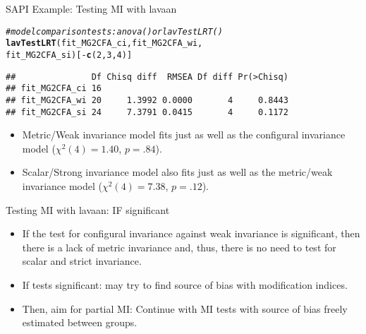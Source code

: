 \documentclass[10pt]{beamer}\usepackage[]{graphicx}\usepackage[]{xcolor}
\makeatletter
\newcommand{\hlnum}[1]{\textcolor[rgb]{0.686,0.059,0.569}{#1}}%
\newcommand{\hlcom}[1]{\textcolor[rgb]{0.678,0.584,0.686}{\textit{#1}}}%
\newcommand{\hlopt}[1]{\textcolor[rgb]{0,0,0}{#1}}%
\newcommand{\hldef}[1]{\textcolor[rgb]{0.345,0.345,0.345}{#1}}%
\newcommand{\hlkwd}[1]{\textcolor[rgb]{0.737,0.353,0.396}{\textbf{#1}}}%
\newenvironment{kframe}{%
 \def\at@end@of@kframe{}%
 \ifinner\ifhmode%
  \def\at@end@of@kframe{\end{minipage}}%
  \begin{minipage}{\columnwidth}%
 \fi\fi%
 \def\FrameCommand##1{\hskip\@totalleftmargin \hskip-\fboxsep
 \colorbox{shadecolor}{##1}\hskip-\fboxsep
     \hskip-\linewidth \hskip-\@totalleftmargin \hskip\columnwidth}%
 \MakeFramed {\advance\hsize-\width
   \@totalleftmargin\z@ \linewidth\hsize
   \@setminipage}}%
 {\par\unskip\endMakeFramed%
 \at@end@of@kframe}
\newenvironment{knitrout}{}{} %
\makeatother
\begin{document}
\begin{frame}[fragile]{SAPI Example: Testing MI with lavaan}

\begin{knitrout}
\color{fgcolor}\begin{kframe}
\begin{alltt}
\hlcom{# model comparison tests: anova() or lavTestLRT()}
\hlkwd{lavTestLRT}\hldef{(fit_MG2CFA_ci, fit_MG2CFA_wi,}
           \hldef{fit_MG2CFA_si)[}\hlopt{-}\hlkwd{c}\hldef{(}\hlnum{2}\hldef{,}\hlnum{3}\hldef{,}\hlnum{4}\hldef{)]}
\end{alltt}
\begin{verbatim}
##               Df Chisq diff  RMSEA Df diff Pr(>Chisq)
## fit_MG2CFA_ci 16                                     
## fit_MG2CFA_wi 20     1.3992 0.0000       4     0.8443
## fit_MG2CFA_si 24     7.3791 0.0415       4     0.1172
\end{verbatim}
\end{kframe}
\end{knitrout}

\begin{itemize}
    \item Metric/Weak invariance model fits just as well as the configural invariance model ($\chi^2(4) = 1.40$, $p = .84$).
    \item Scalar/Strong invariance model also fits just as well as the metric/weak invariance model ($\chi^2(4) = 7.38$, $p = .12$).
\end{itemize}

\end{frame}
%
\begin{frame}{Testing MI with lavaan: IF significant}

\begin{itemize}
\item If the test for configural invariance against weak invariance is significant, then there is a lack of metric invariance and, thus, there is no need to test for scalar and strict invariance.\\
	\vspace{5mm}
    \item If tests significant: may try to find source of bias with modification indices.
    \item Then, aim for partial MI: Continue with MI tests with source of bias freely estimated between groups.
\end{itemize}

\end{frame}
\end{document}
